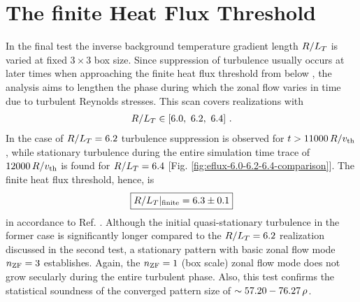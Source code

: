 
\newpage
\section{The finite Heat Flux Threshold}
\label{sec:threshold}

In the final test the inverse background temperature gradient length $R/L_T$ is varied at fixed $3\times3$ box size.
Since suppression of turbulence usually occurs at later times when approaching the finite heat flux threshold from below \cite{Peeters2016}, the analysis aims to lengthen the phase during which the zonal flow varies in time due to turbulent Reynolds stresses.
This scan covers realizations with
\begin{gather*}
	R/L_T \in [6.0,~6.2,~6.4]~.
\end{gather*}
In the case of $R/L_T = 6.2$ turbulence suppression is observed for $t > 11000\,R/v_{\mathrm{th}}$, while stationary turbulence during the entire simulation time trace of $12000\,R/v_{\mathrm{th}}$ is found for $R/L_T = 6.4$ [Fig. \ref{fig:eflux-6.0-6.2-6.4-comparison}].
The finite heat flux threshold, hence, is
\begin{gather*}
	\boxed{R/L_T|_\mathrm{finite} = 6.3 \pm 0.1}
\end{gather*}
in accordance to Ref. .
Although the initial quasi-stationary turbulence in the former case is significantly longer compared to the $R/L_T = 6.2$ realization discussed in the second test, a stationary pattern with basic zonal flow mode $n_\mathrm{ZF} = 3$ establishes. 
Again, the $n_\mathrm{ZF} = 1$ (box scale) zonal flow mode does not grow secularly during the entire turbulent phase.
Also, this test confirms the statistical soundness of the converged pattern size of $\sim 57.20 - 76.27\,\rho$.

